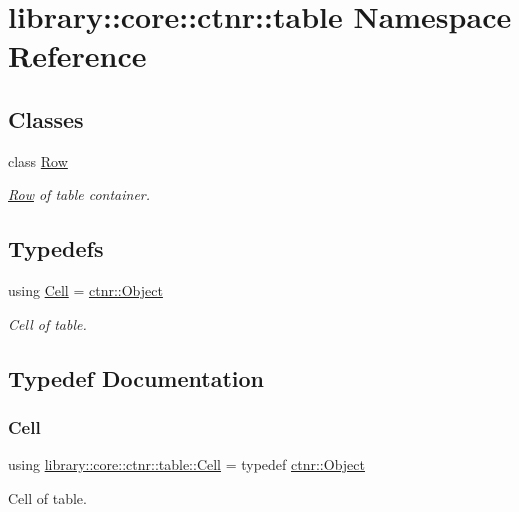 \hypertarget{namespacelibrary_1_1core_1_1ctnr_1_1table}{}\section{library\+:\+:core\+:\+:ctnr\+:\+:table Namespace Reference}
\label{namespacelibrary_1_1core_1_1ctnr_1_1table}
\subsection*{Classes}
\begin{DoxyCompactItemize}
\item 
class \hyperlink{classlibrary_1_1core_1_1ctnr_1_1table_1_1_row}{Row}
\begin{DoxyCompactList}\small\item\em \hyperlink{classlibrary_1_1core_1_1ctnr_1_1table_1_1_row}{Row} of table container. \end{DoxyCompactList}\end{DoxyCompactItemize}
\subsection*{Typedefs}
\begin{DoxyCompactItemize}
\item 
using \hyperlink{namespacelibrary_1_1core_1_1ctnr_1_1table_aac6007d595b2967513e8e6b89f6092f5}{Cell} = \hyperlink{classlibrary_1_1core_1_1ctnr_1_1_object}{ctnr\+::\+Object}
\begin{DoxyCompactList}\small\item\em Cell of table. \end{DoxyCompactList}\end{DoxyCompactItemize}


\subsection{Typedef Documentation}
\mbox{\label{namespacelibrary_1_1core_1_1ctnr_1_1table_aac6007d595b2967513e8e6b89f6092f5}} 
\subsubsection{\texorpdfstring{Cell}{Cell}}
{\footnotesize\ttfamily using \hyperlink{namespacelibrary_1_1core_1_1ctnr_1_1table_aac6007d595b2967513e8e6b89f6092f5}{library\+::core\+::ctnr\+::table\+::\+Cell} = typedef \hyperlink{classlibrary_1_1core_1_1ctnr_1_1_object}{ctnr\+::\+Object}}



Cell of table. 

